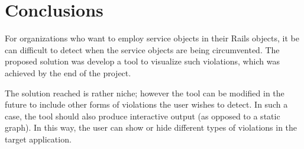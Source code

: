 \chapter{Conclusions}
\label{chap:conclusions}

For organizations who want to employ service objects in their Rails objects, it be can difficult to detect when the service objects are being circumvented. The proposed solution was develop a tool to visualize such violations, which was achieved by the end of the project.

The solution reached is rather niche; however the tool can be modified in the future to include other forms of violations the user wishes to detect. In such a case, the tool should also produce interactive output (as opposed to a static graph). In this way, the user can show or hide different types of violations in the target application.
